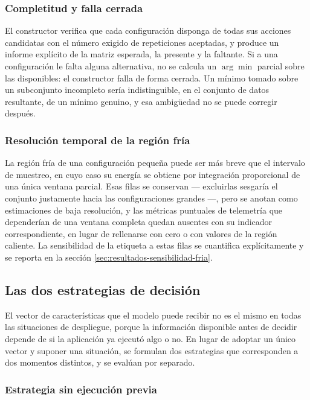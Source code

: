 \documentclass[12pt,oneside,spanish]{book}
\begin{document}
\subsubsection*{Completitud y falla cerrada}

El constructor verifica que cada configuración disponga de todas sus acciones candidatas con el número exigido de repeticiones aceptadas, y produce un informe explícito de la matriz esperada, la presente y la faltante. Si a una configuración le falta alguna alternativa, no se calcula un $\arg\min$ parcial sobre las disponibles: el constructor falla de forma cerrada. Un mínimo tomado sobre un subconjunto incompleto sería indistinguible, en el conjunto de datos resultante, de un mínimo genuino, y esa ambigüedad no se puede corregir después.

\subsubsection*{Resolución temporal de la región fría}

La región fría de una configuración pequeña puede ser más breve que el intervalo de muestreo, en cuyo caso su energía se obtiene por integración proporcional de una única ventana parcial. Esas filas se conservan --- excluirlas sesgaría el conjunto justamente hacia las configuraciones grandes ---, pero se anotan como estimaciones de baja resolución, y las métricas puntuales de telemetría que dependerían de una ventana completa quedan ausentes con su indicador correspondiente, en lugar de rellenarse con cero o con valores de la región caliente. La sensibilidad de la etiqueta a estas filas se cuantifica explícitamente y se reporta en la sección \ref{sec:resultados-sensibilidad-fria}.

\subsection{Las dos estrategias de decisión}
\label{sec:fase2-estrategias}

El vector de características que el modelo puede recibir no es el mismo en todas las situaciones de despliegue, porque la información disponible antes de decidir depende de si la aplicación ya ejecutó algo o no. En lugar de adoptar un único vector y suponer una situación, se formulan dos estrategias que corresponden a dos momentos distintos, y se evalúan por separado.

\subsubsection*{Estrategia sin ejecución previa}
\end{document}
